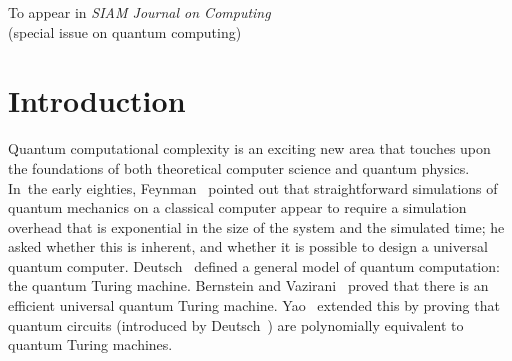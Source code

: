\vspace{-18cm}
\begin{flushright}
To appear in {\sl SIAM Journal on Computing}\\
(special issue on quantum computing)
\end{flushright}

\newpage

\section{Introduction}

Quantum computational complexity is an exciting new area that touches upon
the foundations of both theoretical computer science and quantum physics.
In~the early eighties, Feynman~\cite{Fe} pointed out that straightforward
simulations of quantum mechanics on a classical computer appear to require a
simulation overhead that is exponential in the size of the system and the
simulated time; he asked whether this is inherent, and whether it is possible
to design a universal quantum computer. Deutsch~\cite{De} defined a general
model of quantum computation: the quantum Turing machine.  Bernstein and
Vazirani~\cite{BV} proved that there is an efficient universal quantum Turing
machine. Yao~\cite{Ya} extended this by proving that quantum circuits
(introduced by Deutsch~\cite{De2}) are polynomially equivalent to quantum
Turing machines.

